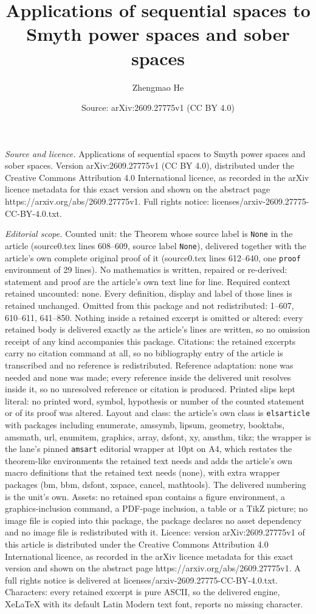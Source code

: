 \documentclass[10pt,a4paper]{amsart}
\title[Applications of sequential spaces to Smyth power spaces and ]{Applications of sequential spaces to Smyth power spaces and sober spaces}
\author{Zhengmao He}
\date{Source: arXiv:2609.27775v1 (CC BY 4.0)}
\begin{document}
\maketitle

\noindent\emph{Source and licence.} Applications of sequential spaces to Smyth power spaces and sober spaces. Version arXiv:2609.27775v1 (CC BY 4.0), distributed under the Creative Commons Attribution 4.0 International licence, as recorded in the arXiv licence metadata for this exact version and shown on the abstract page https://arxiv.org/abs/2609.27775v1. Full rights notice: licenses/arxiv-2609.27775-CC-BY-4.0.txt.\par\smallskip

\noindent\textit{Editorial scope.} Counted unit: the Theorem whose source label is \texttt{None} in the article (source0.tex lines 608--609, source label \texttt{None}), delivered together with the article's own complete original proof of it (source0.tex lines 612--640, one \texttt{proof} environment of 29 lines). No mathematics is written, repaired or re-derived: statement and proof are the article's own text line for line. Required context retained uncounted: none. Every definition, display and label of those lines is retained unchanged. Omitted from this package and not redistributed: 1--607, 610--611, 641--850. Nothing inside a retained excerpt is omitted or altered: every retained body is delivered exactly as the article's lines are written, so no omission receipt of any kind accompanies this package. Citations: the retained excerpts carry no citation command at all, so no bibliography entry of the article is transcribed and no reference is redistributed. Reference adaptation: none was needed and none was made; every reference inside the delivered unit resolves inside it, so no unresolved reference or citation is produced. Printed slips kept literal: no printed word, symbol, hypothesis or number of the counted statement or of its proof was altered. Layout and class: the article's own class is \texttt{elsarticle} with packages including enumerate, amssymb, lipsum, geometry, booktabs, amsmath, url, enumitem, graphics, array, dsfont, xy, amsthm, tikz; the wrapper is the lane's pinned \texttt{amsart} editorial wrapper at 10pt on A4, which restates the theorem-like environments the retained text needs and adds the article's own macro definitions that the retained text needs (none), with extra wrapper packages (bm, bbm, dsfont, xspace, cancel, mathtools). The delivered numbering is the unit's own. Assets: no retained span contains a figure environment, a graphics-inclusion command, a PDF-page inclusion, a table or a TikZ picture; no image file is copied into this package, the package declares no asset dependency and no image file is redistributed with it. Licence: version arXiv:2609.27775v1 of this article is distributed under the Creative Commons Attribution 4.0 International licence, as recorded in the arXiv licence metadata for this exact version and shown on the abstract page https://arxiv.org/abs/2609.27775v1. A full rights notice is delivered at licenses/arxiv-2609.27775-CC-BY-4.0.txt. Characters: every retained excerpt is pure ASCII, so the delivered engine, XeLaTeX with its default Latin Modern text font, reports no missing character.
\end{document}
